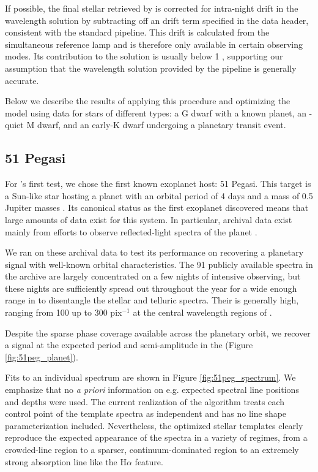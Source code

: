 \documentclass[modern]{aastex62}
\begin{document}
If possible, the final stellar \RV retrieved by \wobble is corrected for intra-night drift in the wavelength solution by subtracting off an \RV drift term specified in the data header, consistent with the standard \HARPS pipeline. 
This drift is calculated from the simultaneous reference lamp and is therefore only available in certain observing modes. 
Its contribution to the \RV solution is usually below 1 \ms, supporting our assumption that the wavelength solution provided by the \HARPS pipeline is generally accurate.

Below we describe the results of applying this procedure and optimizing the \wobble model using \HARPS data for stars of different types: a G dwarf with a known planet, an \RV-quiet M dwarf, and an early-K dwarf undergoing a planetary transit event.

\subsection{51 Pegasi}

For \wobble's first test, we chose the first known exoplanet host: 51 Pegasi. 
This target is a Sun-like star hosting a planet with an orbital period of 4 days and a mass of 0.5 Jupiter masses \citep{Mayor1995}. 
Its canonical status as the first exoplanet discovered means that large amounts of data exist for this system. 
In particular, archival \HARPS data exist mainly from efforts to observe reflected-light spectra of the planet \citep{Martins2015}. 

We ran \wobble on these archival data to test its performance on recovering a planetary signal with well-known orbital characteristics.
The 91 publicly available spectra in the \HARPS archive are largely concentrated on a few nights of intensive observing, but these nights are sufficiently spread out throughout the year for a wide enough range in \BERV to disentangle the stellar and telluric spectra. 
Their \SNR is generally high, ranging from 100 up to 300 pix$^{-1}$ at the central wavelength regions of \HARPS.

Despite the sparse phase coverage available across the planetary orbit, we recover a signal at the expected period and semi-amplitude in the \RVs (Figure \ref{fig:51peg_planet}). 

Fits to an individual spectrum are shown in Figure \ref{fig:51peg_spectrum}. 
We emphasize that no \textit{a priori} information on e.g. expected spectral line positions and depths were used. 
The current realization of the \wobble algorithm treats each control point of the template spectra as independent and has no line shape parameterization included. 
Nevertheless, the optimized stellar templates clearly reproduce the expected appearance of the spectra in a variety of regimes, from a crowded-line region to a sparser, continuum-dominated region to an extremely strong absorption line like the H$\alpha$ feature.
\end{document}
